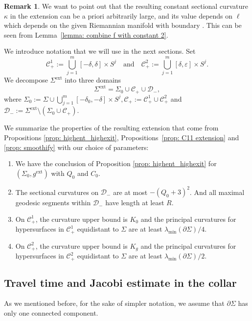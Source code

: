 \documentclass[10pt]{amsart}
\newenvironment{enumeratei}
{\bgroup\def\theenumi{\roman{enumi}}\def\theenumii{\arabic{enumii}}\begin{enumerate}}
{\end{enumerate}\egroup}
\newcommand{\ext}{\mathrm{ext}}
\theoremstyle{definition}
\newtheorem{remark}[theorem]{Remark}
\let\eps\varepsilon
\renewcommand{\>}{{\rangle}}
\newcommand{\<}{{\langle}}
\begin{document}
\begin{remark}\label{remark about kappa}
We want to point out that the resulting constant sectional curvature $\kappa$ in the extension can be a priori arbitrarily large, and its value depends on $\ell$ which depends on the given Riemannian manifold with boundary . This can be seen from Lemma~\ref{lemma: combine f with constant 2}.
\end{remark}

We introduce notation that we will use in the next sections.
Set
\[
\mathcal{C}_+^1:=\bigcup_{j=1}^m[-\delta, \delta] \times S^j\quad\text{and}\quad\mathcal{C}_+^2:=\bigcup_{j=1}^m[\delta, \eps] \times S^j.
\]
We decompose $\Sigma^{\ext}$ into three domains
\[
\Sigma^{\ext}=\Sigma_0\cup \mathcal{C}_+\cup \mathcal{D}_-,
\]
where $\Sigma_0:=\Sigma \cup\bigcup_{j=1}^m [-\delta_0, -\delta]\times S^j, \mathcal{C}_+:=\mathcal{C}_+^1\cup \mathcal{C}_+^2$ and $\mathcal{D}_-:=\Sigma^{\ext}\setminus (\Sigma_0\cup \mathcal{C}_+)$.

We summarize the properties of the resulting extension that come from Propositions \ref{prop: highent_highexit}, Propositions~\ref{prop: C11 extension} and \ref{prop: smoothify} with our choice of parameters:

\begin{enumeratei}
\item\label{enumi:i}
We have the conclusion of Proposition \ref{prop: highent_highexit} for $(\Sigma_0, g^{\ext})$ with $Q_0$ and $C_0$.

\item\label{enumi:ii}
The sectional curvatures on $\mathcal{D}_-$ are at most $-(Q_0+3)^2$. And all maximal geodesic segments within $\mathcal{D}_-$ have length at least $R$.

\item\label{enumi:iii}
On $\mathcal{C}_+^1$, the curvature upper bound is $K_0$ and the principal curvatures for hypersurfaces in $\mathcal{C}_+^1$ equidistant to $\Sigma$ are at least $\lambda_{\min}(\partial\Sigma)/4$.

\item\label{enumi:iv}
On $\mathcal{C}_+^2$, the curvature upper bound is $K_g$ and the principal curvatures for hypersurfaces in $\mathcal{C}_+^2$ equidistant to $\Sigma$ are at least $\lambda_{\min}(\partial\Sigma)/2$.
\end{enumeratei}

\subsection{Travel time and Jacobi estimate in the collar}
As we mentioned before, for the sake of simpler notation, we assume that $\partial\Sigma$ has only one connected component.
\end{document}
